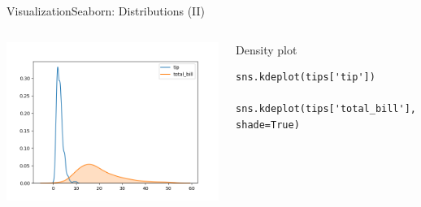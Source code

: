 \documentclass[10pt,compress]{beamer} %
\begin{document}
\begin{frame}[fragile]{Visualization}{Seaborn: Distributions (II)}
\begin{columns}[t]
	\includegraphics[width=\textwidth]{figs/sns-histogram4.png}\\
	\begin{exampleblock}{\footnotesize{Density plot}}
	\vspace{-0.2cm} 
	\begin{lstlisting}[basicstyle=\small]
	sns.kdeplot(tips['tip'])
	sns.kdeplot(tips['total_bill'], shade=True)
	\end{lstlisting}
	\vspace{-0.2cm} 
	\end{exampleblock}
	\end{columns}
\end{frame}
\end{document}
